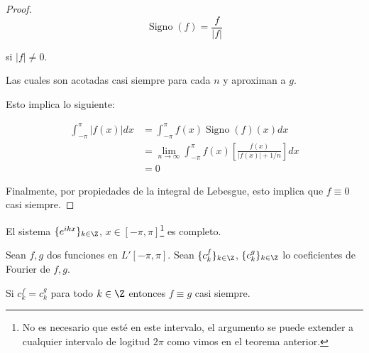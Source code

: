 \begin{proof}
{    \[
        \operatorname*{Signo}(f) = \frac{f}{|f|}
    \]
    
    si $|f| \neq 0$.}

    Las cuales son acotadas casi siempre para cada $n$ y aproximan a $g$.

    Esto implica lo siguiente:

    \begin{equation*}
        \begin{split}
            \int_{-\pi}^{\pi} |f(x)|dx &= \int_{-\pi}^{\pi} f(x)\operatorname*{Signo}(f)(x)dx \\
            &= \lim_{n \to \infty} \int_{-\pi}^{\pi} f(x) \left[ \frac{f(x)}{|f(x)| + 1/n} \right]dx \\
            &= 0
        \end{split}
    \end{equation*}

    Finalmente, por propiedades de la integral de Lebesgue, esto implica que $f \equiv 0$ casi siempre.
\end{proof}

\begin{cor}
    El sistema $\{ e^{ikx} \}_{k \in \Z}$, $x \in [-\pi, \pi]$\footnote{No es necesario que esté en este intervalo, el argumento se puede extender a cualquier intervalo de logitud $2\pi$ como vimos en el teorema anterior.} es completo.
\end{cor}

\begin{cor}
    Sean $f, g$ dos funciones en $L'[-\pi, \pi]$. Sean $\{c_k^f\}_{k \in \Z}$, $\{c_k^g\}_{k \in \Z}$ lo coeficientes de Fourier de $f, g$.

    Si $c_k^f = c_k^g$ para todo $k \in \Z$ entonces $f \equiv g$ casi siempre.
\end{cor}